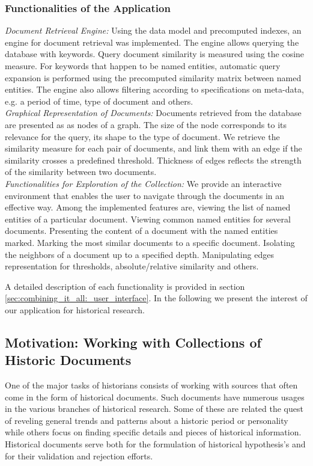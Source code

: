 \subsubsection{Functionalities of the Application}

\emph{Document Retrieval Engine:} Using the data model and precomputed indexes, an engine for document retrieval was implemented. 
The engine allows querying the database with keywords. Query document similarity is measured using the cosine measure. 
For keywords that happen to be named entities, automatic query expansion is performed using the precomputed similarity matrix between 
named entities.  The engine also allows filtering according to specifications on meta-data, e.g. a period of time, type of document and others.\\ 
\emph{Graphical Representation of Documents:} Documents retrieved from the database are presented as as nodes of a graph. The size of the node corresponds to its relevance for the query, its shape to the type of document.  We retrieve the similarity measure for each pair of documents, and link them with an edge if the similarity crosses a predefined threshold. Thickness of edges reflects the strength of the similarity between two documents.\\
\emph{Functionalities for Exploration of the Collection:} We provide an interactive environment that enables the user to navigate through the documents in an effective way. Among the implemented features are, viewing the list of named entities of a particular document. Viewing common named entities for several documents. Presenting the content of a document with the named entities marked. Marking the most similar documents to a specific document. Isolating the neighbors of a document up to a specified depth. Manipulating edges representation for thresholds, absolute/relative similarity and others.

A detailed description of each functionality is provided in section \ref{sec:combining_it_all:_user_interface}. In the following we present the interest of our application for historical research. 

\subsection{Motivation: Working with Collections of Historic Documents}
\label{sec:motivation}
One of the major tasks of historians consists of working with sources that often come in the form of historical documents. 
Such documents have numerous usages in the various branches of historical research. Some of these are related the quest of reveling 
general trends and patterns about a historic period or personality while others focus on finding specific details and pieces of historical 
information. Historical documents serve both for the formulation of historical hypothesis's and for their validation and rejection efforts. 

